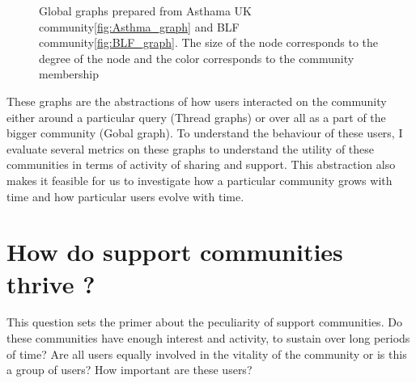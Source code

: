 \begin{figure}[!ht]
    \centering
    \caption{Global graphs prepared from Asthama UK community\ref{fig:Asthma_graph} and BLF community\ref{fig:BLF_graph}. The size of the node corresponds to the degree of the node and the color corresponds to the community membership }
\end{figure}

These graphs are the abstractions of how users interacted on the community either around a particular query (Thread graphs) or over all as a part of the bigger community (Gobal graph). To understand the behaviour of these users, I evaluate several metrics on these graphs to understand the utility of these communities in terms of activity of sharing and support. This abstraction also makes it feasible for us to investigate how a particular community grows with time and how particular users evolve with time.

\section{How do support communities thrive ?}
This question sets the primer about the peculiarity of support communities. Do these communities have enough interest and activity, to sustain over long periods of time? Are all users equally involved in the vitality of the community or is this a group of users? How important are these users?  

